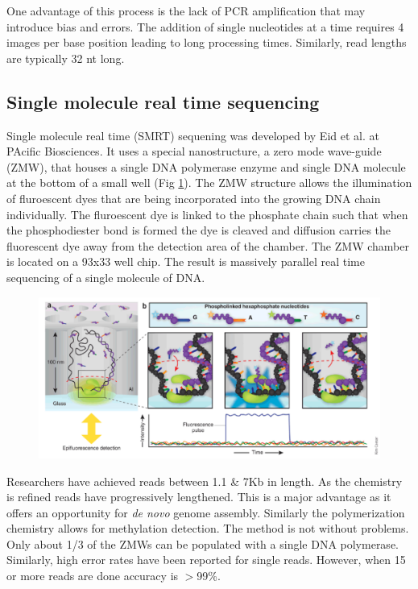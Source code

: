 \documentclass{report}\usepackage[]{graphicx}\usepackage[]{color}
\begin{document}
One advantage of this process is the lack of PCR amplification that may introduce bias and
errors. The addition of single nucleotides at a time requires 4 images per base position leading 
to long processing times. Similarly, read lengths are typically 32 nt long. 


\subsection*{Single molecule real time sequencing}
Single molecule real time (SMRT) sequening was developed by Eid et al. at PAcific Biosciences. 
It uses a special nanostructure, a zero mode wave-guide (ZMW), that houses a single 
DNA polymerase enzyme and single DNA molecule at the bottom of a small well (Fig \ref{fig:SMRT}). 
The ZMW structure allows the illumination of fluroescent dyes that are being incorporated into the 
growing DNA chain individually. The fluroescent dye is linked to the phosphate chain such
that when the phosphodiester bond is formed the dye is cleaved and diffusion carries the 
fluorescent dye away from the detection area of the chamber. The ZMW chamber 
is located on a 93x33 well chip. The result is massively parallel real time sequencing of 
a single molecule of DNA. 

\begin{figure}[H]
\centering
    \includegraphics[width=.8\textwidth]{images/SMRT.pdf}
    \caption{}\label{fig:SMRT} 
\end{figure}

Researchers have achieved reads between 1.1 \& 7Kb in length. 
As the chemistry is refined reads have
progressively lengthened. This is a major advantage as it offers an opportunity for 
\textit{de novo} genome assembly. Similarly the polymerization chemistry allows for
methylation detection. The method is not without problems. 
Only about 1/3 of the ZMWs can be populated with a single DNA polymerase. 
Similarly, high error rates have been reported for single reads. However,
when 15 or more reads are done accuracy is $>$99\%. 
\end{document}
